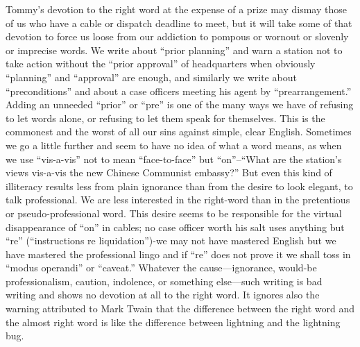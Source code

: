 \documentclass[
    oneside,
    11pt,
    draft
]{memoir}
\begin{document}
Tommy's devotion to the right word at the expense of a prize may dismay those of us who have a cable or dispatch deadline to meet, but it will take some of that devotion to force us loose from our addiction to pompous or wornout or slovenly or imprecise words. We write about \enquote{prior planning} and warn a station not to take action without the \enquote{prior approval} of headquarters when obviously \enquote{planning} and \enquote{approval} are enough, and similarly we write about \enquote{preconditions} and about a case officers meeting his agent by \enquote{prearrangement.} Adding an unneeded \enquote{prior} or \enquote{pre} is one of the many ways we have of refusing to let words alone, or refusing to let them speak for themselves. This is the commonest and the worst of all our sins against simple, clear English. Sometimes we go a little further and seem to have no idea of what a word means, as when we use \enquote{vis-a-vis} not to mean \enquote{face-to-face} but \enquote{on}--\enquote{What are the station's views vis-a-vis the new Chinese Communist embassy?} But even this kind of illiteracy results less from plain ignorance than from the desire to look elegant, to talk professional. We are less interested in the right-word than in the pretentious or pseudo-professional word. This desire seems to be responsible for the virtual disappearance of \enquote{on} in cables; no case officer worth his salt uses anything but \enquote{re} (\enquote{instructions re liquidation})-we may not have mastered English but we have mastered the professional lingo and if \enquote{re} does not prove it we shall toss in \enquote{modus operandi} or \enquote{caveat.} Whatever the cause---ignorance, would-be professionalism, caution, indolence, or something else---such writing is bad writing and shows no devotion at all to the right word. It ignores also the warning attributed to Mark Twain that the difference between the right word and the almost right word is like the difference between lightning and the lightning bug. 
\end{document}
